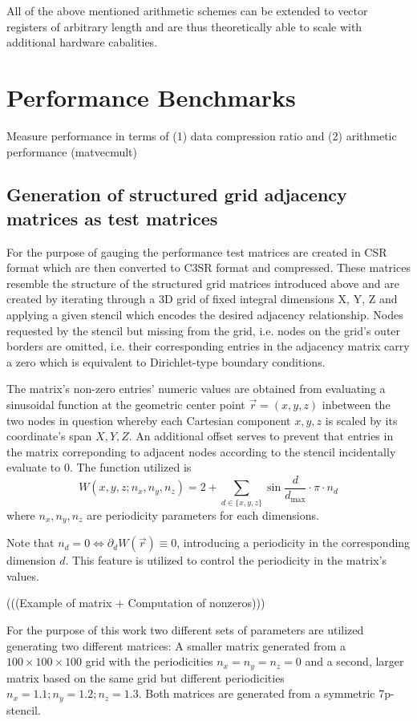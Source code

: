 \documentclass{article}
\begin{document}
      All of the above mentioned arithmetic schemes can be extended to vector registers of arbitrary length and are thus theoretically able to scale with additional hardware cabalities.

\section{Performance Benchmarks}
  Measure performance in terms of (1) data compression ratio and (2) arithmetic performance (matvecmult)

  \subsection{Generation of structured grid adjacency matrices as test matrices}

    For the purpose of gauging the performance test matrices are created in CSR format which are then converted to C3SR
    format and compressed. These matrices resemble the structure of the structured grid matrices introduced above and
    are created by iterating through a 3D grid of fixed integral dimensions X, Y, Z and applying a given stencil
    which encodes the desired adjacency relationship. Nodes requested by the stencil but missing from the grid, i.e.
    nodes on the grid's outer borders are omitted, i.e. their corresponding entries in the adjacency matrix carry a zero
    which is equivalent to Dirichlet-type boundary conditions.

    The matrix's non-zero entries' numeric values are obtained from evaluating a sinusoidal function at the geometric
    center point $\vec{r} = (x, y, z)$ inbetween the two nodes in question whereby each Cartesian component $x, y, z$ is
    scaled by its coordinate's span $X, Y, Z$. An additional offset serves to prevent that entries in the matrix
    correponding to adjacent nodes according to the stencil incidentally evaluate to 0. The function utilized is
    $$W(x,y,z; n_x, n_y, n_z) = 2 + \sum \limits_{d \in \{x,y,z\}} \sin{\frac{d}{d_{\text{max}}} \cdot \pi \cdot n_d} $$
    where $n_x, n_y, n_z$ are periodicity parameters for each dimensions.

    Note that $n_d = 0 \Leftrightarrow \partial_d W(\vec{r}) \equiv 0$, introducing a periodicity in the corresponding
    dimension $d$. This feature is utilized to control the periodicity in the matrix's values.

    (((Example of matrix + Computation of nonzeros)))

    For the purpose of this work two different sets of parameters are utilized generating two different matrices: A smaller matrix generated from a $100 \times 100 \times 100$ grid with the periodicities $n_x = n_y = n_z = 0$ and a second, larger matrix based on the same grid but different periodicities $n_x = 1.1; n_y = 1.2; n_z = 1.3$. Both matrices are generated from a symmetric 7p-stencil.
\end{document}
